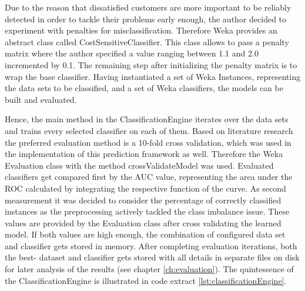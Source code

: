 Due to the reason that dissatisfied customers are more important to be reliably detected in order to tackle their problems early enough, the author decided to experiment with penalties for misclassification. Therefore Weka provides an abstract class called CostSensitiveClassifier. This class allows to pass a penalty matrix where the author specified a value ranging between 1.1 and 2.0 incremented by 0.1. The remaining step after initializing the penalty matrix is to wrap the base classifier. Having instantiated a set of Weka Instances, representing the data sets to be classified, and a set of Weka classifiers, the models can be built and evaluated. 

Hence, the main method in the ClassificationEngine iterates over the data sets and trains every selected classifier on each of them. Based on literature research the preferred evaluation method is a 10-fold cross validation, which was used in the implementation of this prediction framework as well. Therefore the Weka Evaluation class with the method crossValidateModel was used. Evaluated classifiers get compared first by the AUC value, representing the area under the ROC calculated by integrating the respective function of the curve. As second measurement it was decided to consider the percentage of correctly classified instances as the preprocessing actively tackled the class imbalance issue. These values are provided by the Evaluation class after cross validating the learned model. If both values are high enough, the combination of configured data set and classifier gets stored in memory. After completing evaluation iterations, both the best- dataset and classifier gets stored with all details in separate files on disk for later analysis of the results (see chapter \ref{ch:evaluation}). The quintessence of the ClassificationEngine is illustrated in code extract \ref{lst:classificationEngine}. 

